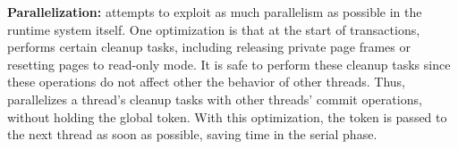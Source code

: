 \textbf{Parallelization: }
\dthreads{} attempts to exploit as much parallelism as possible in the runtime system itself. One optimization is that at the start of transactions, \dthreads{} performs certain cleanup tasks, including releasing private page frames or resetting pages to read-only mode. It is safe to perform these cleanup tasks since these operations do not affect other the behavior of other threads.
Thus, \dthreads{} parallelizes a thread's cleanup tasks with other threads’ commit operations, without holding the global token. With this optimization, the token is passed to the next thread as soon as possible, saving time in the serial phase. 